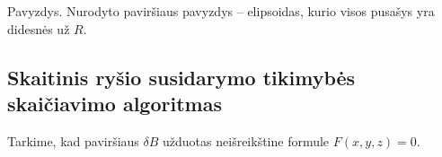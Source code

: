 \documentclass[10pt]{article}
\def\boldhline{\noalign{\global\arrayrulewidth.8pt}\hline\noalign{\global\arrayrulewidth.4pt}}
\begin{document}
Pavyzdys. Nurodyto paviršiaus pavyzdys -- elipsoidas, kurio visos pusašys yra didesnės už $ R $.


 
\subsection{Skaitinis ryšio susidarymo tikimybės skaičiavimo algoritmas}
Tarkime, kad paviršiaus $ \delta B $ užduotas neišreikštine formule $ F(x,y,z) = 0 $.




%
\end{document}

